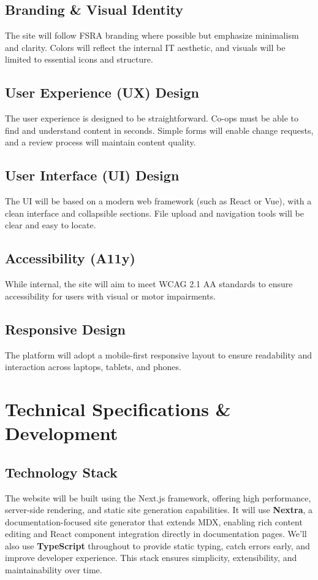 \documentclass[11pt,a4paper]{article}
\begin{document}
\subsection{Branding \& Visual Identity}
The site will follow FSRA branding where possible but emphasize minimalism and clarity. Colors will reflect the internal IT aesthetic, and visuals will be limited to essential icons and structure.

\subsection{User Experience (UX) Design}
The user experience is designed to be straightforward. Co-ops must be able to find and understand content in seconds. Simple forms will enable change requests, and a review process will maintain content quality.

\subsection{User Interface (UI) Design}
The UI will be based on a modern web framework (such as React or Vue), with a clean interface and collapsible sections. File upload and navigation tools will be clear and easy to locate.

\subsection{Accessibility (A11y)}
While internal, the site will aim to meet WCAG 2.1 AA standards to ensure accessibility for users with visual or motor impairments.

\subsection{Responsive Design}
The platform will adopt a mobile-first responsive layout to ensure readability and interaction across laptops, tablets, and phones.

\section{Technical Specifications \& Development}
  \subsection{Technology Stack}
    The website will be built using the Next.js framework, offering high performance, server-side rendering, and static site generation capabilities. It will use \textbf{Nextra}, a documentation-focused site generator that extends MDX, enabling rich content editing and React component integration directly in documentation pages. We’ll also use \textbf{TypeScript} throughout to provide static typing, catch errors early, and improve developer experience. This stack ensures simplicity, extensibility, and maintainability over time.
\end{document}
